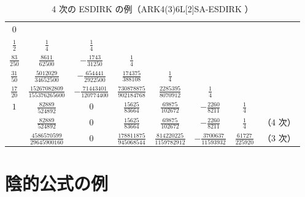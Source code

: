 \begin{table}[bp]
    \caption{4 次の ESDIRK の例（ARK4(3)6L[2]SA-ESDIRK \cite{Kennedy2003}）}
    \label{table:ode_runge-kutta_butcher-array-ark436l2sa-esdirk}
    \centering
    \begin{tabular}{c|ccccccc}
        $0$              &                                    &                               &                               &                                &                             &                        &       \\
        $\frac{1}{2}$    & $\frac{1}{4}$                      & $\frac{1}{4}$                 &                               &                                &                             &                        &       \\
        $\frac{83}{250}$ & $\frac{8611}{62500}$               & $-\frac{1743}{31250}$         & $\frac{1}{4}$                 &                                &                             &                        &       \\
        $\frac{31}{50}$  & $\frac{5012029}{34652500}$         & $-\frac{654441}{2922500}$     & $\frac{174375}{388108}$       & $\frac{1}{4}$                  &                             &                        &       \\
        $\frac{17}{20}$  & $\frac{15267082809}{155376265600}$ & $-\frac{71443401}{120774400}$ & $\frac{730878875}{902184768}$ & $\frac{2285395}{8070912}$      & $\frac{1}{4}$               &                        &       \\
        $1$              & $\frac{82889}{524892}$             & $0$                           & $\frac{15625}{83664}$         & $\frac{69875}{102672}$         & $-\frac{2260}{8211}$        & $\frac{1}{4}$          &       \\
        \hline
                         & $\frac{82889}{524892}$             & $0$                           & $\frac{15625}{83664}$         & $\frac{69875}{102672}$         & $-\frac{2260}{8211}$        & $\frac{1}{4}$          & （4 次） \\
                         & $\frac{4586570599}{29645900160}$   & $0$                           & $\frac{178811875}{945068544}$ & $\frac{814220225}{1159782912}$ & $-\frac{3700637}{11593932}$ & $\frac{61727}{225920}$ & （3 次）
    \end{tabular}
\end{table}
\section{陰的公式の例}

